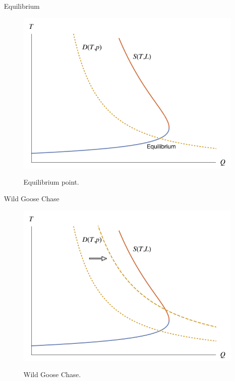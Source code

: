     \begin{frame}{Equilibrium}
        \begin{figure}
            \centering
            {\includegraphics[scale=0.30]{plots/equilibrium_0.png}}
            \caption{Equilibrium point.}
        \end{figure}
    \end{frame}


    \begin{frame}{Wild Goose Chase}
        \begin{figure}
            \centering
            {\includegraphics[scale=0.30]{plots/wild_goose_chase_0.png}}
            \caption{Wild Goose Chase.}
        \end{figure}
    \end{frame}

